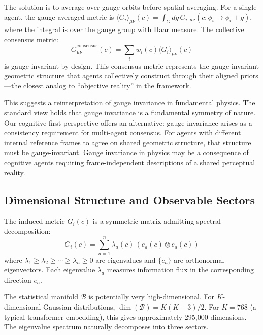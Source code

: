 \documentclass[11pt]{article}
\begin{document}
The solution is to average over gauge orbits before spatial averaging. For a single agent, the gauge-averaged metric is $\langle G_i \rangle_{\mu\nu}(c) = \int_G dg \, G_{i,\mu\nu}(c; \phi_i \to \phi_i + g)$, where the integral is over the gauge group with Haar measure. The collective consensus metric:
\begin{equation}
\bar{G}_{\mu\nu}^{\mathrm{consensus}}(c) = \sum_i w_i(c)\langle G_i\rangle_{\mu\nu}(c)
\end{equation}
is gauge-invariant by design. This consensus metric represents the gauge-invariant geometric structure that agents collectively construct through their aligned priors---the closest analog to ``objective reality'' in the framework.

This suggests a reinterpretation of gauge invariance in fundamental physics. The standard view holds that gauge invariance is a fundamental symmetry of nature. Our cognitive-first perspective offers an alternative: gauge invariance arises as a consistency requirement for multi-agent consensus. For agents with different internal reference frames to agree on shared geometric structure, that structure must be gauge-invariant. Gauge invariance in physics may be a consequence of cognitive agents requiring frame-independent descriptions of a shared perceptual reality.

\subsection{Dimensional Structure and Observable Sectors}

The induced metric $G_i(c)$ is a symmetric matrix admitting spectral decomposition:
\begin{equation}
G_i(c) = \sum_{a=1}^n \lambda_a(c) \, (e_a(c) \otimes e_a(c))
\end{equation}
where $\lambda_1 \geq \lambda_2 \geq \cdots \geq \lambda_n \geq 0$ are eigenvalues and $\{e_a\}$ are orthonormal eigenvectors. Each eigenvalue $\lambda_a$ measures information flux in the corresponding direction $e_a$.

The statistical manifold $\mathcal{B}$ is potentially very high-dimensional. For $K$-dimensional Gaussian distributions, $\dim(\mathcal{B}) = K(K+3)/2$. For $K=768$ (a typical transformer embedding), this gives approximately 295,000 dimensions. The eigenvalue spectrum naturally decomposes into three sectors.
\end{document}
